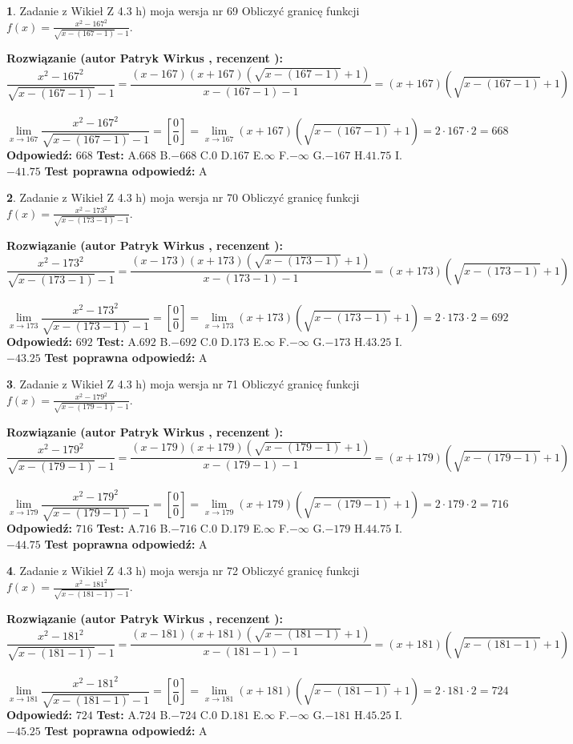 \documentclass[12pt, a4paper]{article}
\theoremstyle{definition} %
\newtheorem{zad}{}
\newcommand{\zadStart}[1]{\begin{zad}#1\newline}
\newcommand{\zadStop}{\end{zad}}
\newcommand{\rozwStart}[2]{\noindent \textbf{Rozwiązanie (autor #1 , recenzent #2): }\newline}
\newcommand{\rozwStop}{\newline}
\newcommand{\odpStart}{\noindent \textbf{Odpowiedź:}\newline}
\newcommand{\odpStop}{\newline}
\newcommand{\testStart}{\noindent \textbf{Test:}\newline}
\newcommand{\testStop}{\newline}
\newcommand{\kluczStart}{\noindent \textbf{Test poprawna odpowiedź:}\newline}
\newcommand{\kluczStop}{\newline}
\begin{document}
\zadStart{Zadanie z Wikieł Z 4.3 h) moja wersja nr 69}
Obliczyć granicę funkcji $f(x)=\frac{x^{2} - 167^{2}}{\sqrt{x-(167-1)}-1}$.
\zadStop
\rozwStart{Patryk Wirkus}{}
$$\frac{x^{2} - 167^{2}}{\sqrt{x-(167-1)}-1}=\frac{(x-167)(x+167)(\sqrt{x-(167-1)}+1)}{x-(167-1)-1}=(x+167)(\sqrt{x-(167-1)}+1)$$
\\
$$\lim\limits_{x\to 167}\frac{x^{2} - 167^{2}}{\sqrt{x-(167-1)}-1}=[\frac{0}{0}]=
\lim\limits_{x\to 167}(x+167)(\sqrt{x-(167-1)}+1) = 2\cdot167 \cdot 2 = 668$$
\rozwStop
\odpStart
$668$
\odpStop
\testStart
A.$668$
B.$-668$
C.$0$
D.$167$
E.$\infty$
F.$-\infty$
G.$-167$
H.$41.75$
I.$-41.75$
\testStop
\kluczStart
A
\kluczStop



\zadStart{Zadanie z Wikieł Z 4.3 h) moja wersja nr 70}
Obliczyć granicę funkcji $f(x)=\frac{x^{2} - 173^{2}}{\sqrt{x-(173-1)}-1}$.
\zadStop
\rozwStart{Patryk Wirkus}{}
$$\frac{x^{2} - 173^{2}}{\sqrt{x-(173-1)}-1}=\frac{(x-173)(x+173)(\sqrt{x-(173-1)}+1)}{x-(173-1)-1}=(x+173)(\sqrt{x-(173-1)}+1)$$
\\
$$\lim\limits_{x\to 173}\frac{x^{2} - 173^{2}}{\sqrt{x-(173-1)}-1}=[\frac{0}{0}]=
\lim\limits_{x\to 173}(x+173)(\sqrt{x-(173-1)}+1) = 2\cdot173 \cdot 2 = 692$$
\rozwStop
\odpStart
$692$
\odpStop
\testStart
A.$692$
B.$-692$
C.$0$
D.$173$
E.$\infty$
F.$-\infty$
G.$-173$
H.$43.25$
I.$-43.25$
\testStop
\kluczStart
A
\kluczStop



\zadStart{Zadanie z Wikieł Z 4.3 h) moja wersja nr 71}
Obliczyć granicę funkcji $f(x)=\frac{x^{2} - 179^{2}}{\sqrt{x-(179-1)}-1}$.
\zadStop
\rozwStart{Patryk Wirkus}{}
$$\frac{x^{2} - 179^{2}}{\sqrt{x-(179-1)}-1}=\frac{(x-179)(x+179)(\sqrt{x-(179-1)}+1)}{x-(179-1)-1}=(x+179)(\sqrt{x-(179-1)}+1)$$
\\
$$\lim\limits_{x\to 179}\frac{x^{2} - 179^{2}}{\sqrt{x-(179-1)}-1}=[\frac{0}{0}]=
\lim\limits_{x\to 179}(x+179)(\sqrt{x-(179-1)}+1) = 2\cdot179 \cdot 2 = 716$$
\rozwStop
\odpStart
$716$
\odpStop
\testStart
A.$716$
B.$-716$
C.$0$
D.$179$
E.$\infty$
F.$-\infty$
G.$-179$
H.$44.75$
I.$-44.75$
\testStop
\kluczStart
A
\kluczStop



\zadStart{Zadanie z Wikieł Z 4.3 h) moja wersja nr 72}
Obliczyć granicę funkcji $f(x)=\frac{x^{2} - 181^{2}}{\sqrt{x-(181-1)}-1}$.
\zadStop
\rozwStart{Patryk Wirkus}{}
$$\frac{x^{2} - 181^{2}}{\sqrt{x-(181-1)}-1}=\frac{(x-181)(x+181)(\sqrt{x-(181-1)}+1)}{x-(181-1)-1}=(x+181)(\sqrt{x-(181-1)}+1)$$
\\
$$\lim\limits_{x\to 181}\frac{x^{2} - 181^{2}}{\sqrt{x-(181-1)}-1}=[\frac{0}{0}]=
\lim\limits_{x\to 181}(x+181)(\sqrt{x-(181-1)}+1) = 2\cdot181 \cdot 2 = 724$$
\rozwStop
\odpStart
$724$
\odpStop
\testStart
A.$724$
B.$-724$
C.$0$
D.$181$
E.$\infty$
F.$-\infty$
G.$-181$
H.$45.25$
I.$-45.25$
\testStop
\kluczStart
A
\kluczStop
\end{document}
